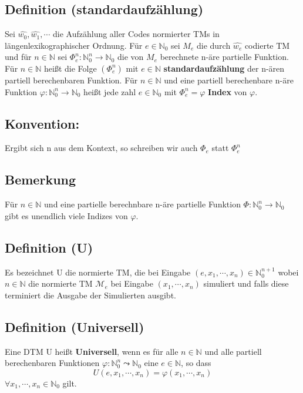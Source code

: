\subsection{Definition (standardaufzählung)} Sei $\hat{w_0}, \hat{w_1}, \cdots$ die Aufzählung aller Codes normierter TMs in längenlexikographischer Ordnung. Für $e \in \mathbb{N}_0$ sei $M_e$ die durch $\hat{w_e}$ codierte TM und für $n \in \mathbb{N}$ sei $\Phi_e^n : \mathbb{N}_0^n \rightarrow \mathbb{N}_0$ die von $M_e$ berechnete n-äre partielle Funktion. Für $n \in \mathbb{N}$ heißt die Folge $(\Phi_e^n)$ mit $e\in \mathbb{N}$ \textbf{standardaufzählung} der n-ären partiell berechenbaren Funktion. Für $n \in \mathbb{N} $ und eine partiell berechenbare n-äre Funktion $\varphi: \mathbb{N}_0^n \rightarrow \mathbb{N}_0$ heißt jede zahl $e \in \mathbb{N}_0$ mit $\Phi_e^n = \varphi$ \textbf{Index} von $\varphi$.

\subsection*{Konvention: } Ergibt sich n aus dem Kontext, so schreiben wir auch $\Phi_e$ statt $\Phi_e^n$

\subsection{Bemerkung} Für $n \in \mathbb{N}$ und eine partielle berechnbare n-äre partielle Funktion $\Phi : \mathbb{N}_0^n \rightarrow \mathbb{N}_0$ gibt es unendlich viele Indizes von $\varphi$.

\subsection{Definition (U)} Es bezeichnet U die normierte TM, die bei Eingabe $(e, x_1, \cdots, x_n) \in \mathbb{N}_0^{n+1}$ wobei $n \in \mathbb{N}$ die normierte TM $\mathcal{M}_e$ bei Eingabe $(x_1, \cdots, x_n)$ simuliert und falls diese terminiert die Ausgabe der Simulierten ausgibt.

\subsection{Definition (Universell)} Eine DTM U heißt \textbf{Universell}, wenn es für alle $n \in \mathbb{N}$ und alle partiell berechenbaren Funktionen $\varphi : \mathbb{N}_0^n \leadsto \mathbb{N}_0$ eine $e \in \mathbb{N}$, so dass \[U(e, x_1, \cdots, x_n) = \varphi(x_1, \cdots, x_n)\] $\forall x_1, \cdots, x_n \in \mathbb{N}_0$ gilt.

